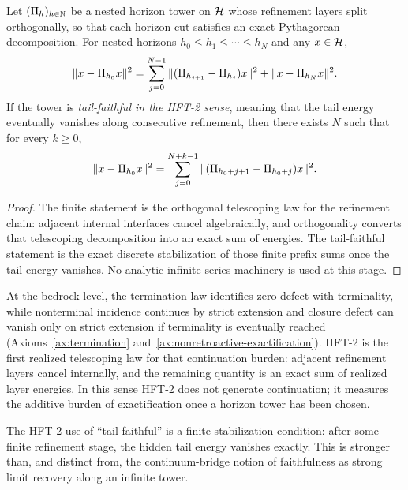 \begin{theorem}
\label{thm:HFT2-general}\label{thm:HFT}
Let $(\Pi_{h})_{h\in\mathbb{N}}$ be a nested horizon tower on $\mathcal{H}$ whose refinement layers split orthogonally, so that each horizon cut satisfies an exact Pythagorean decomposition.
For nested horizons $h_0 \le h_1 \le \cdots \le h_N$ and any $x\in\mathcal{H}$,
\[
\|x - \Pi_{h_0} x\|^2
=
\sum_{j=0}^{N-1} \|(\Pi_{h_{j+1}} - \Pi_{h_j})x\|^2 + \|x - \Pi_{h_N} x\|^2.
\]
If the tower is \emph{tail-faithful in the HFT-2 sense}, meaning that the tail
energy eventually vanishes along consecutive refinement, then there exists $N$
such that for every $k \ge 0$,
\[
\|x - \Pi_{h_0} x\|^2
=
\sum_{j=0}^{N+k-1} \|(\Pi_{h_0+j+1} - \Pi_{h_0+j})x\|^2.
\]
\end{theorem}

\begin{proof}
The finite statement is the orthogonal telescoping law for the refinement chain: adjacent internal interfaces cancel algebraically, and orthogonality converts that telescoping decomposition into an exact sum of energies.
The tail-faithful statement is the exact discrete stabilization of those finite
prefix sums once the tail energy vanishes.
No analytic infinite-series machinery is used at this stage.
\end{proof}

\begin{remark}
\label{rem:hft2-realized-exactification-ledger}
At the bedrock level, the termination law identifies zero defect with
terminality, while nonterminal incidence continues by strict extension and
closure defect can vanish only on strict extension if terminality is
eventually reached
(Axioms~\ref{ax:termination} and~\ref{ax:nonretroactive-exactification}).
HFT-2 is the first realized telescoping law for that continuation burden:
adjacent refinement layers cancel internally, and the remaining quantity is an
exact sum of realized layer energies. In this sense HFT-2 does not generate
continuation; it measures the additive burden of exactification once a horizon
tower has been chosen.
\end{remark}

\begin{remark}
\label{rem:hft2-tail-faithfulness}
The HFT-2 use of ``tail-faithful'' is a finite-stabilization condition: after
some finite refinement stage, the hidden tail energy vanishes exactly.
This is stronger than, and distinct from, the continuum-bridge notion of
faithfulness as strong limit recovery along an infinite tower.
\end{remark}

